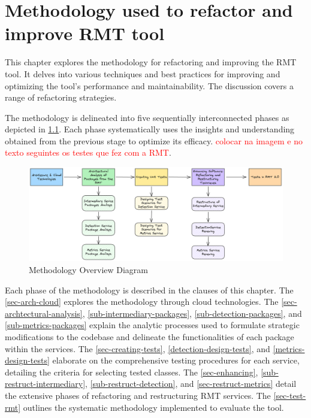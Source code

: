\chapter{Methodology used to refactor and improve RMT tool}%
\label{methodology}

This chapter explores the methodology for refactoring and improving the RMT tool. It delves into various techniques and best practices for improving and optimizing the tool's performance and maintainability. The discussion covers a range of refactoring strategies.

The methodology is delineated into five sequentially interconnected phases as depicted in \cref{fig-overview-methodology}. Each phase systematically uses the insights and understanding obtained from the previous stage to optimize its efficacy. 
\textcolor{red}{colocar na imagem e no texto seguintes os testes que fez com a RMT}.

\begin{figure}[ht!]
\SetCaptionWidth{\textwidth}
\caption{Methodology Overview Diagram}
\label{fig-overview-methodology}
\includegraphics[width =\textwidth]{Chapter-4/Figures/Metodologia.png}
\end{figure}
\FloatBarrier


Each phase of the methodology is described in the clauses of this chapter. The \cref{sec-arch-cloud} explores the methodology through cloud technologies. The \cref{sec-archtectural-analysis}, \ref{sub-intermediary-packages}, \ref{sub-detection-packages}, and \ref{sub-metrics-packages} explain the analytic processes used to formulate strategic modifications to the codebase and delineate the functionalities of each package within the services. The \cref{sec-creating-tests}, \ref{detection-design-tests}, and \ref{metrics-design-tests} elaborate on the comprehensive testing procedures for each service, detailing the criteria for selecting tested classes. The \cref{sec-enhancing}, \ref{sub-restruct-intermediary}, \ref{sub-restruct-detection}, and \ref{sec-restruct-metrics} detail the extensive phases of refactoring and restructuring RMT services. The \cref{sec-test-rmt} outlines the systematic methodology implemented to evaluate the tool.


